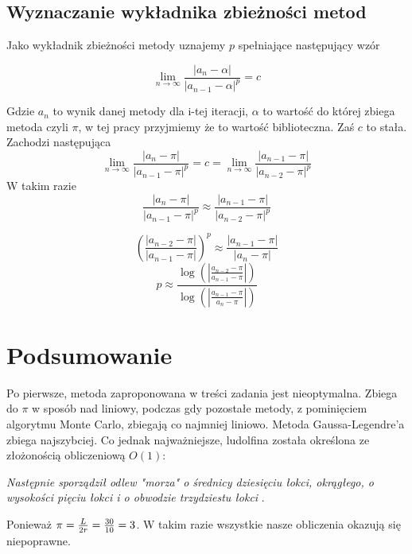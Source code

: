 \documentclass[11pt, wide, leqno]{mwart}
\begin{document}
\subsection{Wyznaczanie wykładnika zbieżności metod}

Jako wykładnik zbieżności metody uznajemy $p$ spełniające następujący wzór \cite{bog}

\[\lim_{n \to \infty} \frac{|a_n - \alpha|}{|a_{n-1} - \alpha|^p} = c  \]

Gdzie $a_n$ to wynik danej metody dla i-tej iteracji, $\alpha$ to wartość do której zbiega metoda czyli $\pi$, w tej pracy przyjmiemy że to wartość biblioteczna. Zaś $c$ to stała. Zachodzi następująca
\[ \lim_{n \to \infty} \frac{|a_n - \pi|}{|a_{n-1} - \pi|^p} = c = \lim_{n \to \infty} \frac{|a_{n-1} - \pi|}{|a_{n-2} - \pi|^p} \]
W takim razie 
\[ \frac{|a_n - \pi|}{|a_{n-1} - \pi|^p} \approx \frac{|a_{n-1} - \pi|}{|a_{n-2} - \pi|^p} \]

\[ (\frac{|a_{n-2} - \pi|}{|a_{n-1} - \pi|})^p \approx \frac{|a_{n-1} - \pi|}{|a_{n} - \pi|} \]
\[ p \approx \frac{\log(|\frac{a_{n-2} - \pi}{a_{n-1} - \pi}|)}{\log(|\frac{a_{n-1} - \pi}{a_{n} - \pi}|)}
\]









\newpage

\section{Podsumowanie}

Po pierwsze, metoda zaproponowana w treści zadania jest nieoptymalna. Zbiega do $\pi$ w sposób nad liniowy, podczas gdy pozostałe metody, z pominięciem algorytmu Monte Carlo, zbiegają co najmniej liniowo. Metoda Gaussa-Legendre'a zbiega najszybciej. Co jednak najważniejsze, ludolfina została określona ze złożonością obliczeniową $O(1)$: 

\begin{center}
    \emph{Następnie sporządził odlew "morza" o średnicy dziesięciu łokci, okrągłego, o wysokości pięciu łokci i o obwodzie trzydziestu łokci} \cite{biblia}. 
\end{center}
Ponieważ $\pi={L\over 2r}={30\over 10}=3$. W takim razie wszystkie nasze obliczenia okazują się niepoprawne.

\koniec
\end{document}
